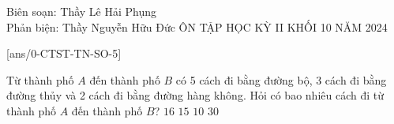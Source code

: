 
\setcounter{demsode}{5} %

\begin{name}
	{Biên soạn: Thầy Lê Hải Phụng\\
	Phản biện: Thầy Nguyễn Hữu Đức}
	{ÔN TẬP HỌC KỲ II KHỐI 10 NĂM 2024}
\end{name}

\cautn
{}[ans/0-CTST-TN-SO-5]
\setcounter{ex}{0}

\begin{ex}%
	Từ thành phố $A$ đến thành phố $B$ có 5 cách đi bằng đường bộ, 3 cách đi bằng đường thủy và 2 cách đi bằng đường hàng không. Hỏi có bao nhiêu cách đi từ thành phố $A$ đến thành phố $B$?
	\choice
	{$16$}
	{$15$}
	{\True $10$}
	{$30$}
	\loigiai{}
\end{ex}

